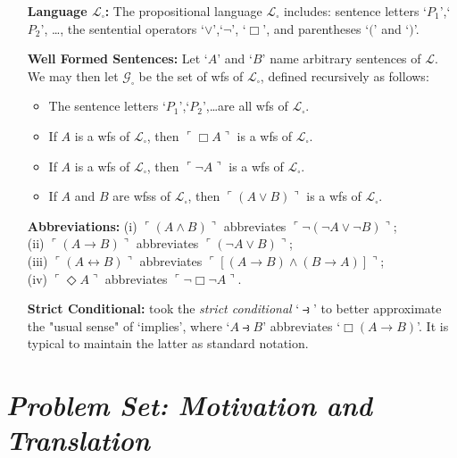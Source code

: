 \documentclass[a4paper, 11pt]{article} %
\newcommand{\corner}[1]{\ulcorner#1\urcorner} %
\begin{document}
\begin{enumerate}[leftmargin=1.2in,labelsep=.15in] 
\item[\bf Language $\boldsymbol{\mathcal{L}_\square}$:] The propositional language $\mathcal{L}_\square$ includes: sentence letters `$P_1$',`$P_2$', \dots, the sentential operators `$\vee$',`$\neg$', `$\Box$', and parentheses `$($' and `$)$'.
\item[\bf Well Formed Sentences:] Let `$A$' and `$B$' name arbitrary sentences of $\mathcal{L}$. We may then let $\mathcal{G}_\square$ be the set of wfs of $\mathcal{L}_\square$, defined recursively as follows:
\begin{itemize}
\item The sentence letters `$P_1$',`$P_2$',\dots are all wfs of $\mathcal{L}_\square$. 
\item If ${A}$ is a wfs of $\mathcal{L}_\square$, then $\corner{\Box A}$ is a wfs of $\mathcal{L}_\square$.
\item If ${A}$ is a wfs of $\mathcal{L}_\square$, then $\corner{\neg A}$ is a wfs of $\mathcal{L}_\square$.
\item If ${A}$ and ${B}$ are wfss of $\mathcal{L}_\square$, then $\corner{(A\vee B)}$ is a wfs of $\mathcal{L}_\square$.
\end{itemize}
\item[\bf Abbreviations:] (i) $\corner{(A\wedge B)}$ abbreviates $\corner{\neg(\neg A\vee\neg B)}$;\\ (ii) $\corner{(A\rightarrow B)}$ abbreviates $\corner{(\neg A\vee B)}$;\\ (iii) $\corner{(A\leftrightarrow B)}$ abbreviates $\corner{[(A\rightarrow B)\wedge(B\rightarrow A)]}$;\\ (iv) $\corner{\Diamond A}$ abbreviates $\corner{\neg\Box\neg A}$.
\item[\bf Strict Conditional:] \citet{Lewis1932} took the \textit{strict conditional} `$\strictif$' to better approximate the "usual sense" of `implies', where `$A\strictif B$' abbreviates `$\Box(A\rightarrow B)$'. It is typical to maintain the latter as standard notation. 
\end{enumerate}


\section*{\it Problem Set: Motivation and Translation}
\end{document}
